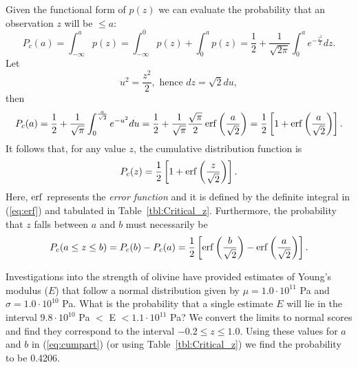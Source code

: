 Given the functional form of $p(z)$ we can evaluate the probability that an observation 
$z$ will be $\leq a$:
\begin{equation}
P_c(a) = \int ^a_{-\infty} p (z) = \int ^0 _{-\infty} p (z) + \int^a_0 p(z) = \frac{1}{2} + \frac{1}{\sqrt{2\pi}} \int ^a_0
e^{- \frac{z^2}{2}} dz.
\end{equation}	 
Let
\begin{equation}
u^2 = \frac{z^2}{2}, \mbox{ hence } dz = \sqrt{2} du,
\end{equation}	 
then
\begin{equation}
P_c(a) = \frac{1}{2} + \frac{1}{\sqrt{\pi}} \int^{\frac{a}{\sqrt{2}}}_{0} e^{-u^2} du = 
\frac{1}{2} + \frac{1}{\sqrt{\pi}} \frac{\sqrt{\pi}}{2} \erf{\left ( \frac{a}{\sqrt{2}} \right)} =
\frac{1}{2} \left [ 1 + \erf \left( \frac{a}{\sqrt{2}} \right) \right ].
\label{eq:erf}
\index{Error function ($\erf$)}
\index{$\erf$ (error function)}
\end{equation}	 
It follows that, for any value $z$, the cumulative distribution function is
\begin{equation}
	\index{Cumulative normal distribution}
P_c(z) = \frac{1}{2} \left [ 1 + \erf \left ( \frac{z}{\sqrt{2}} \right) \right]. 
\end{equation}
Here, $\operatorname{erf}$ represents the \emph{error function} and it is defined by the definite integral in (\ref{eq:erf})
and tabulated in Table~\ref{tbl:Critical_z}.
Furthermore, the probability that $z$ falls between $a$ and $b$ must necessarily be 
\begin{equation}
P_c (a \leq z \leq b) = P_c (b) - P_c (a)
 = \frac{1}{2} \left[ \operatorname{erf}  \left ( \frac{b}{\sqrt{2}}\right) -
\operatorname{erf} \left( \frac{a}{\sqrt{2}}\right)\right].
\label{eq:cumpart}
\end{equation}
\begin{example}
Investigations into the strength of olivine have provided estimates of Young's modulus ($E$) 
that follow a normal distribution given by $\mu = 1.0\cdot10^{11}$ Pa and $\sigma = 1.0 \cdot 10^{10}$ Pa.  What is the 
probability that a single estimate $E$ will lie in the interval  $9.8 \cdot 10^{10}$ Pa $<$ E $< 1.1\cdot 10^{11}$ Pa?  We 
convert the limits to normal scores and find they correspond to the interval $-0.2 \leq z \leq 1.0$.  Using 
these values for $a$ and $b$ in (\ref{eq:cumpart}) (or using Table~\ref{tbl:Critical_z}) we find the probability to be 0.4206.
\end{example}

